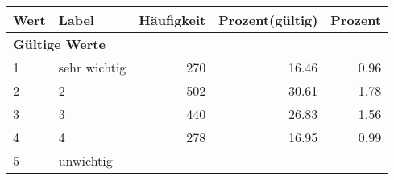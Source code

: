      \begin{longtable}{lXrrr}
     \toprule
     \textbf{Wert} & \textbf{Label} & \textbf{Häufigkeit} & \textbf{Prozent(gültig)} & \textbf{Prozent} \\
     \endhead
     \midrule
     \multicolumn{5}{l}{\textbf{Gültige Werte}}\\

     1 &
     \multicolumn{1}{X}{ sehr wichtig   } &


       \num{270} &
       \num[round-mode=places,round-precision=2]{16.46} &
         \num[round-mode=places,round-precision=2]{0.96} \\

     2 &
     \multicolumn{1}{X}{ 2   } &


       \num{502} &
       \num[round-mode=places,round-precision=2]{30.61} &
         \num[round-mode=places,round-precision=2]{1.78} \\

     3 &
     \multicolumn{1}{X}{ 3   } &


       \num{440} &
       \num[round-mode=places,round-precision=2]{26.83} &
         \num[round-mode=places,round-precision=2]{1.56} \\

     4 &
     \multicolumn{1}{X}{ 4   } &


       \num{278} &
       \num[round-mode=places,round-precision=2]{16.95} &
         \num[round-mode=places,round-precision=2]{0.99} \\

     5 &
     \multicolumn{1}{X}{ unwichtig   } &



\end{longtable}
